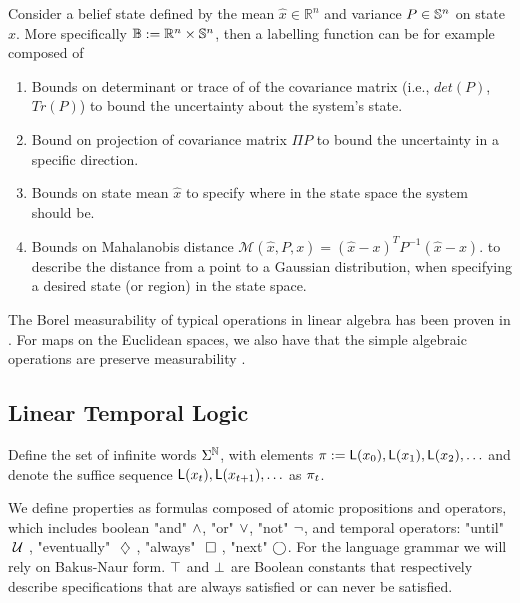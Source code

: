 \documentclass{ifacconf}
\begin{document}
     
     Consider a belief state defined by the mean $\hat x\in \mathbb R^n $ and variance $P\in \S^n$ on state $x$. More specifically $\mathbb B:=\mathbb R^n\times \S^n$,  then a labelling function  can be for example composed of %
     \begin{enumerate}
 	\item Bounds on determinant or trace of of the covariance matrix (i.e., $det(P)$, $Tr(P)$) to  bound the uncertainty about the system's state.
 	\item Bound on projection of covariance matrix $\Pi P$ to bound the uncertainty in a specific direction.
   \item   Bounds on state mean $\hat{x}$ to specify
    where in the state space the system should be. 
    \item Bounds on Mahalanobis distance $\mathcal{M}(\hat{x},P,x) = (\hat{x}-x)^TP^{-1}(\hat{x}-x)$.
    to describe the distance from a point to a Gaussian distribution, when specifying a desired state (or region) in the state space. 
    \end{enumerate}
 
    The Borel measurability of typical operations in linear algebra has been proven in \citep{azoff1974borel}.
For maps on the Euclidean spaces, we also have that the simple algebraic operations are preserve measurability \citep[page 116]{lang1993real}.
 
  
    \subsection{Linear Temporal Logic}
    
    Define the set of infinite
    words $\alphabeth^{\mathbb N}$,  with elements 
$\word:=\Lab(x_0),\Lab(x_1),\Lab(x_2), \ldots$ and denote the suffice sequence  $\Lab(x_t),\Lab(x_{t+1}), \ldots$ as $\word_t$.

   
 We define properties as formulas composed of atomic propositions and operators, which includes boolean "and" $\andltl$, "or" $\orltl$, "not" $\notltl$, and temporal operators: "until" $\Until$, "eventually" $\Event$, "always" $\Always$, "next" $\Next$.
      For the language grammar we will rely on Bakus-Naur form. $\True$ and $\False$ are Boolean constants that respectively describe specifications that are always satisfied or can never be satisfied.
    
\end{document}
